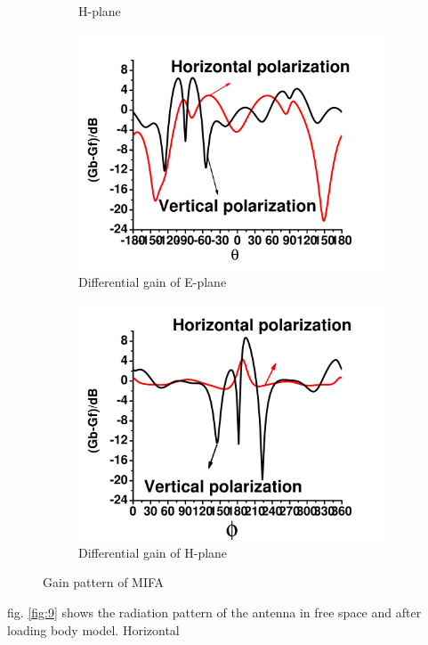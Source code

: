 \documentclass[journal]{IEEEtran}
\begin{document}
\begin{figure}[!htb]
\begin{subfigure}[b]{0.24\textwidth}
\caption{H-plane}
\label{fig:10c}	
\end{subfigure}
\begin{subfigure}[b]{0.24\textwidth}
\includegraphics[width=\textwidth]{figs/10c.pdf}
\caption{Differential gain of E-plane }
\label{fig:10b}
\end{subfigure}
\begin{subfigure}[b]{0.24\textwidth}
\includegraphics[width=\textwidth]{figs/10d.pdf}
\caption{Differential gain of H-plane}
\label{fig:10d}	
\end{subfigure}
\caption{Gain pattern of MIFA}
\label{fig:10}
\end{figure}
fig. \ref{fig:9} shows the radiation pattern of the antenna in free space and after loading body model. Horizontal
\end{document}
